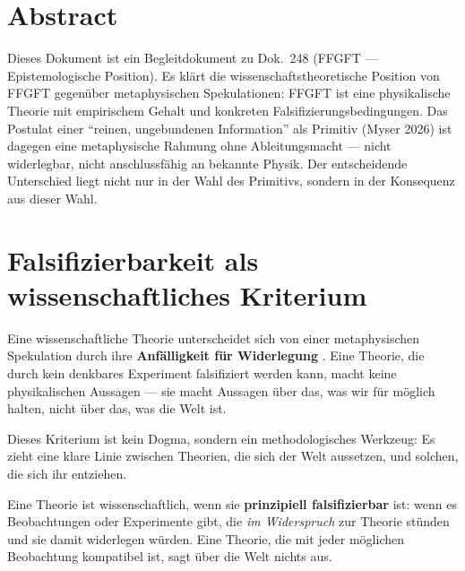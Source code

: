 
\section*{Abstract}

Dieses Dokument ist ein Begleitdokument zu Dok.~248 (FFGFT --- Epistemologische Position). Es klärt die wissenschaftstheoretische Position von FFGFT gegenüber metaphysischen Spekulationen: FFGFT ist eine physikalische Theorie mit empirischem Gehalt und konkreten Falsifizierungsbedingungen. Das Postulat einer ``reinen, ungebundenen Information'' als Primitiv (Myser 2026) ist dagegen eine metaphysische Rahmung ohne Ableitungsmacht --- nicht widerlegbar, nicht anschlussfähig an bekannte Physik. Der entscheidende Unterschied liegt nicht nur in der Wahl des Primitivs, sondern in der Konsequenz aus dieser Wahl.

\tableofcontents
\newpage

\section{Falsifizierbarkeit als wissenschaftliches Kriterium}

Eine wissenschaftliche Theorie unterscheidet sich von einer metaphysischen Spekulation durch ihre \textbf{Anfälligkeit für Widerlegung} \cite{Popper1934}. Eine Theorie, die durch kein denkbares Experiment falsifiziert werden kann, macht keine physikalischen Aussagen --- sie macht Aussagen über das, was wir für möglich halten, nicht über das, was die Welt ist.

Dieses Kriterium ist kein Dogma, sondern ein methodologisches Werkzeug: Es zieht eine klare Linie zwischen Theorien, die sich der Welt aussetzen, und solchen, die sich ihr entziehen.

\begin{keyresult}
Eine Theorie ist wissenschaftlich, wenn sie \textbf{prinzipiell falsifizierbar} ist: wenn es Beobachtungen oder Experimente gibt, die \emph{im Widerspruch} zur Theorie stünden und sie damit widerlegen würden. Eine Theorie, die mit jeder möglichen Beobachtung kompatibel ist, sagt über die Welt nichts aus.
\end{keyresult}

